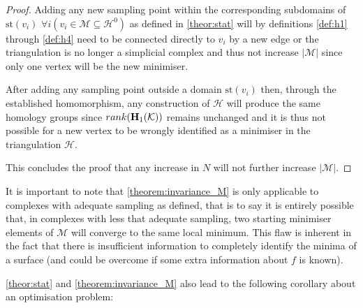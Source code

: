 \begin{proof}
Adding any new sampling point within the corresponding subdomains of $\textrm{st}\left( v_i \right)$ $ \forall i (v_i \in \mathcal{M} \subseteq \mathcal{H}^0 ) $ as defined in \autoref{theor:stat} will by definitions \ref{def:h1} through \ref{def:h4} need to be connected directly to $v_i$ by a new edge or the triangulation is no longer a simplicial complex and thus not increase $|\mathcal{M}|$ since only one vertex will be the new minimiser.

After adding any sampling point outside a domain $\textrm{st}\left( v_i \right)$ then, through the established homomorphism, any construction of $\mathcal{H}$ will produce the same homology groups since $rank (\bold{H}_1(\mathcal{K}))$ remains unchanged and it is thus not possible for a new vertex to be wrongly identified as a minimiser in the triangulation $\mathcal{H}$.

This concludes the proof that any increase in $N$ will not further increase $|\mathcal{M}|$.
\end{proof}


It is important to note that \autoref{theorem:invariance_M} is only applicable to complexes with adequate sampling as defined, that is to say it is entirely possible that, in complexes with less that adequate sampling, two starting minimiser elements of $\mathcal{M}$ will converge to the same local minimum. This flaw is inherent in the fact that there is insufficient information to completely identify the minima of a surface (and could be overcome if some extra information about $f$ is known).


\autoref{theor:stat} and \autoref{theorem:invariance_M} also lead to the following corollary about an optimisation problem:

